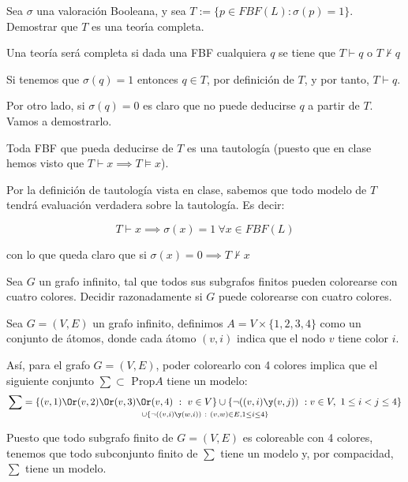 \begin{problem}[3]
Sea $\sigma$ una valoraci\'on Booleana, y sea $T :=\{p\in FBF(L) : \sigma(p) = 1\}$.
Demostrar que $T$ es una teor\'{\i}a completa.
\solution

Una teoría será completa si dada una FBF cualquiera $q$ se tiene que $T \vdash q$ o $T \nvdash q$

Si tenemos que $σ(q)=1$ entonces $q \in T$, por definición de $T$, y por tanto, $T \vdash q$.

Por otro lado, si $σ(q)=0$ es claro que no puede deducirse $q$ a partir de $T$. Vamos a demostrarlo.

Toda FBF que pueda deducirse de $T$ es una tautología (puesto que en clase hemos visto que $T \vdash x \implies T \vDash x$).

Por la definición de tautología vista en clase, sabemos que todo modelo de $T$ tendrá evaluación verdadera sobre la tautología. Es decir:

\[T \vdash x \implies σ(x) = 1 \ \forall x\in FBF(L)\]

con lo que queda claro que si $σ(x)=0 \implies T \nvdash x$
\end{problem}

\begin{problem}[4]
Sea $G$ un grafo infinito, tal que todos sus subgrafos finitos pueden colorearse con cuatro colores.
Decidir razonadamente si $G$ puede colorearse con cuatro colores.
\solution

Sea $G=(V,E)$ un grafo infinito, definimos $A=V \times \{1,2,3,4\}$ como un conjunto de átomos, donde cada átomo $(v,i)$ indica que el nodo $v$ tiene color $i$.

Así, para el grafo $G=(V,E)$, poder colorearlo con 4 colores implica que el siguiente conjunto $\sum \subset \text{ Prop} A$ tiene un modelo:
\[\sum = \{(v,1)\Or (v,2) \Or (v,3) \Or (v,4) \ : \ v \in V\} \cup \{\neg((v,i)\y(v,j)) \ : v \in V, \ 1 \leq i < j \leq 4\}\atop \cup \{\neg((v,i)\y (w,i)) \ : \ (v,w) \in E,  1 \leq i \leq 4\}\]

Puesto que todo subgrafo finito de $G=(V,E)$ es coloreable con 4 colores, tenemos que todo subconjunto finito de $\sum$ tiene un modelo y, por compacidad, $\sum$ tiene un modelo.

\end{problem}

